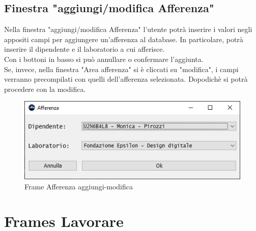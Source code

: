         \subsection {Finestra "aggiungi/modifica Afferenza"}
            Nella finestra "aggiungi/modifica Afferenza" l'utente potrà inserire i valori negli appositi campi per aggiungere un'afferenza al database. In particolare, potrà inserire il dipendente e il laboratorio a cui afferisce.\\
            Con i bottoni in basso si può annullare o confermare l'aggiunta.\\
            Se, invece, nella finestra "Area afferenza" si è cliccati su "modifica", i campi verranno precompilati con quelli dell'afferenza selezionata. Dopodichè si potrà procedere con la modifica.
            \begin{figure}[htbp!]
                \centering
                    \vspace{2\baselineskip}
                    \includegraphics[width=0.7\linewidth]{Immagini/Frames/Frame aggiungi-modifica/Frame Afferenza aggiungi-modifica.png}
                \caption{Frame Afferenza aggiungi-modifica}
                \label{fig:Frame Afferenza aggiungi-modifica}
            \end{figure}

    \newpage

    \section{Frames Lavorare}
